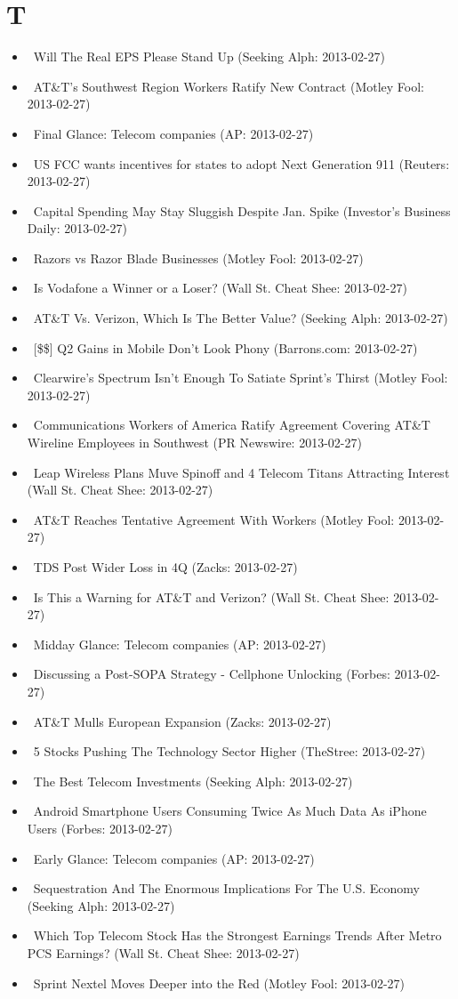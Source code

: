 \documentclass[11pt,asymmetric]{article}
\begin{document}
\section*{T}
\begin{itemize}
\item\ Will The Real EPS Please Stand Up (Seeking Alph: 2013-02-27)
\item\ AT\&T's Southwest Region Workers Ratify New Contract (Motley Fool: 2013-02-27)
\item\ Final Glance: Telecom companies (AP: 2013-02-27)
\item\ US FCC wants incentives for states to adopt Next Generation 911 (Reuters: 2013-02-27)
\item\ Capital Spending May Stay Sluggish Despite Jan. Spike (Investor's Business Daily: 2013-02-27)
\item\ Razors vs Razor Blade Businesses (Motley Fool: 2013-02-27)
\item\ Is Vodafone a Winner or a Loser? (Wall St. Cheat Shee: 2013-02-27)
\item\ AT\&T Vs. Verizon, Which Is The Better Value? (Seeking Alph: 2013-02-27)
\item\ [\$\$] Q2 Gains in Mobile Don't Look Phony (Barrons.com: 2013-02-27)
\item\ Clearwire’s Spectrum Isn't Enough To Satiate Sprint’s Thirst (Motley Fool: 2013-02-27)
\item\ Communications Workers of America Ratify Agreement Covering AT\&T Wireline Employees in Southwest (PR Newswire: 2013-02-27)
\item\ Leap Wireless Plans Muve Spinoff and 4 Telecom Titans Attracting Interest (Wall St. Cheat Shee: 2013-02-27)
\item\ AT\&T Reaches Tentative Agreement With Workers (Motley Fool: 2013-02-27)
\item\ TDS Post Wider Loss in 4Q (Zacks: 2013-02-27)
\item\ Is This a Warning for AT\&T and Verizon? (Wall St. Cheat Shee: 2013-02-27)
\item\ Midday Glance: Telecom companies (AP: 2013-02-27)
\item\ Discussing a Post-SOPA Strategy - Cellphone Unlocking (Forbes: 2013-02-27)
\item\ AT\&T Mulls European Expansion (Zacks: 2013-02-27)
\item\ 5 Stocks Pushing The Technology Sector Higher (TheStree: 2013-02-27)
\item\ The Best Telecom Investments (Seeking Alph: 2013-02-27)
\item\ Android Smartphone Users Consuming Twice As Much Data As iPhone Users (Forbes: 2013-02-27)
\item\ Early Glance: Telecom companies (AP: 2013-02-27)
\item\ Sequestration And The Enormous Implications For The U.S. Economy (Seeking Alph: 2013-02-27)
\item\ Which Top Telecom Stock Has the Strongest Earnings Trends After Metro PCS Earnings? (Wall St. Cheat Shee: 2013-02-27)
\item\ Sprint Nextel Moves Deeper into the Red (Motley Fool: 2013-02-27)
\end{itemize}
\end{document}
